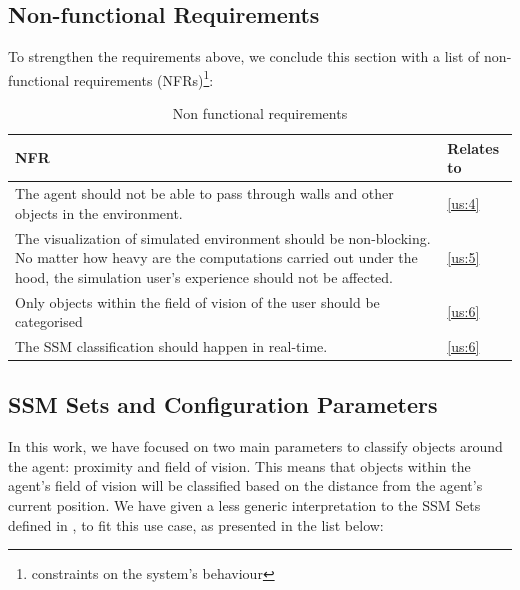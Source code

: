 \subsection{Non-functional Requirements}\label{subsec:nfrs}
To strengthen the requirements above, we conclude this section with a list of non-functional requirements (NFRs)\footnote{constraints on the system's behaviour}:
\begin{table}[H]
	\begin{center}
		\small \begin{tabular*}{1.1\columnwidth}{p{10cm}p{1.5cm}} 
			\\ \hline \hline
			NFR & Relates to \\ \hline \hline

		 	The agent should not be able to pass through walls and other objects in the environment. & \ref{us:4}\\ \hline

		 	The visualization of simulated environment should be non-blocking. No matter how heavy are the computations carried out under the hood, the simulation user's experience should not be affected. & \ref{us:5}\\ \hline

		 	Only objects within the field of vision of the user should be categorised & \ref{us:6}\\ \hline

		 	The SSM classification should happen in real-time. & \ref{us:6}\\ \hline

		\end{tabular*}
		
		\caption{Non functional requirements}
		\label{table:nfr}
	\end{center}
\end{table}

\subsection{SSM Sets and Configuration Parameters}\label{subsec:ssm_params}
In this work, we have focused on two main parameters to classify objects around the agent: proximity and field of vision. This means that objects within the agent's field of vision will be classified based on the distance from the agent's current position. We have given a less generic interpretation to the SSM Sets defined in \cite{pederson2011situative}, to fit this use case, as presented in the list below:
